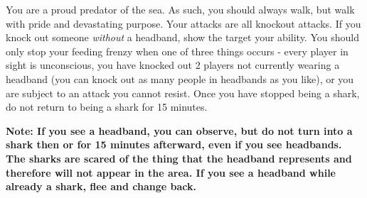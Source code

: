 \documentclass[green]{NeptuneBall}
\begin{document}
You are a proud predator of the sea. As such, you should always walk, but walk with pride and devastating purpose. Your attacks are all knockout attacks. If you knock out someone \emph{without} a  headband, show the target your \aShark{} ability. You should only stop your feeding frenzy when one of three things occurs - every player in sight is unconscious, you have knocked out 2 players not currently wearing a  headband (you can knock out as many people in  headbands as you like), or you are subject to an attack you cannot resist. Once you have stopped being a shark, do not return to being a shark for 15 minutes.

{\bf Note: If you see a  headband, you can observe, but do not turn into a shark then or for 15 minutes afterward, even if you see  headbands. The sharks are scared of the thing that the  headband represents and therefore will not appear in the area. If you see a  headband while already a shark, flee and change back.}
\end{document}
